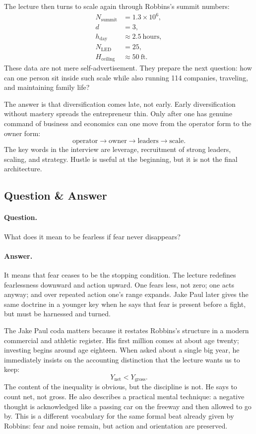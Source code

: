 The lecture then turns to scale again through Robbins's summit numbers:
\begin{align}
N_{\text{summit}} &= 1.3\times 10^{6},\\
d &= 3,\\
h_{\text{day}} &\approx 2.5\ \text{hours},\\
N_{\text{LED}} &= 25,\\
H_{\text{ceiling}} &\approx 50\ \text{ft}.
\end{align}
These data are not mere self-advertisement. They prepare the next question: how can one person sit inside such scale while also running 114 companies, traveling, and maintaining family life?

The answer is that diversification comes late, not early. Early diversification without mastery spreads the entrepreneur thin. Only after one has genuine command of business and economics can one move from the operator form to the owner form:
\begin{equation}
\text{operator} \to \text{owner} \to \text{leaders} \to \text{scale}.
\end{equation}
The key words in the interview are leverage, recruitment of strong leaders, scaling, and strategy. Hustle is useful at the beginning, but it is not the final architecture.

\subsection{Question \& Answer}

\paragraph{Question.} What does it mean to be fearless if fear never disappears?

\paragraph{Answer.} It means that fear ceases to be the stopping condition. The lecture redefines fearlessness downward and action upward. One fears less, not zero; one acts anyway; and over repeated action one's range expands. Jake Paul later gives the same doctrine in a younger key when he says that fear is present before a fight, but must be harnessed and turned.

The Jake Paul coda matters because it restates Robbins's structure in a modern commercial and athletic register. His first million comes at about age twenty; investing begins around age eighteen. When asked about a single big year, he immediately insists on the accounting distinction that the lecture wants us to keep:
\begin{equation}
Y_{\text{net}} < Y_{\text{gross}}.
\end{equation}
The content of the inequality is obvious, but the discipline is not. He says to count net, not gross. He also describes a practical mental technique: a negative thought is acknowledged like a passing car on the freeway and then allowed to go by. This is a different vocabulary for the same formal beat already given by Robbins: fear and noise remain, but action and orientation are preserved.

